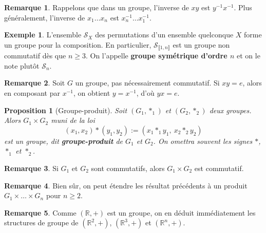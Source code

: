 \documentclass[french]{book}
\newcommand{\R}{\mathbb{R}}
\newcommand{\inv}{^{-1}}
\theoremstyle{plain}
\newtheorem{prop}{Proposition}[chapter]
\theoremstyle{definition}
\newtheorem{exa}{Exemple}[chapter]
\newtheorem{rmq}{Remarque}[chapter]
\theoremstyle{remark}
\begin{document}
\begin{rmq}
	Rappelons que dans un groupe, l'inverse de $xy$ est $y\inv x\inv$. Plus généralement, l'inverse de $x_1\ldots x_n$ est $x_n\inv\ldots x_1\inv$.
\end{rmq}
\begin{exa}
	L'ensemble $\mathcal{S}_X$ des permutations d'un ensemble quelconque $X$ forme un groupe pour la composition. En particulier, $\mathcal{S}_{\llbracket1,n\rrbracket}$ est un groupe non commutatif dès que $n\geqslant3$. On l'appelle \textbf{groupe symétrique d'ordre $n$} et on le note plutôt $\mathcal{S}_n$.
\end{exa}
\begin{rmq}
	Soit $G$ un groupe, pas nécessairement commutatif. Si $xy=e$, alors en composant par $x\inv$, on obtient $y=x\inv$, d'où $yx=e$.
\end{rmq}
\begin{prop}[Groupe-produit]
	Soit $(G_1,*_1)$ et $(G_2,*_2)$ deux groupes. Alors $G_1\times G_2$ muni de la loi $$(x_1,x_2)*(y_1,y_2):=(x_1*_1y_1,\ x_2*_2y_2)$$ est un groupe, dit \textbf{groupe-produit} de $G_1$ et $G_2$. On omettra souvent les signes $*$, $*_1$ et $*_2$.
\end{prop}
\begin{rmq}
	Si $G_1$ et $G_2$ sont commutatifs, alors $G_1\times G_2$ est commutatif.
\end{rmq}
\begin{rmq}
	Bien sûr, on peut étendre les résultat précédents à un produit $G_1\times\ldots\times G_n$ pour $n\geqslant2$.
\end{rmq}
\begin{rmq}
	Comme $(\R,+)$ est un groupe, on en déduit immédiatement les structures de groupe de $(\R^2,+)$, $(\R^3,+)$ et $(\R^n,+)$.
\end{rmq}
\end{document}
